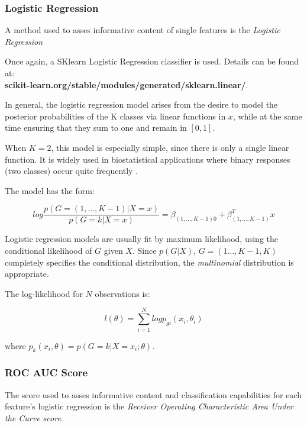 \documentclass[12pt,openright,twoside,a4paper]{book}
\begin{document}
\subsubsection{Logistic Regression}

A method used to asses informative content of single features is the \textit{Logistic Regression}

Once again, a SKlearn Logistic Regression classifier is used. 
Details can be found at: \\ \textbf{scikit-learn.org/stable/modules/generated/sklearn.linear/}.
\vspace{5mm}

In general, the logistic regression model arises from the desire to model the posterior probabilities of the K classes via linear functions in $x$, while at the same time ensuring that they sum to one and remain in $[0,1]$.

When $K = 2$, this model is especially simple, since there is only a single linear function. It is widely used in biostatistical applications where binary responses (two classes) occur quite frequently \cite{ESL}.

The model has the form:

\begin{equation}
log\frac{p(G=(1,...,K-1)|X=x)}{p(G=k|X=x)}=\beta_{(1,...,K-1)0}+\beta^T_{(1,...,K-1)}x
\end{equation}

Logistic regression models are usually fit by maximum likelihood, using the conditional likelihood of $G$ given $X$. Since $p(G|X)$, $G=(1...,K-1,K)$ completely specifies the conditional distribution, the \textit{multinomial} distribution is appropriate. 

The log-likelihood for $N$ observations is:

\begin{equation}
l(\theta)=\sum_{i=1}^N log p_{gi}(x_i,\theta_i)
\end{equation}

where $p_k(x_i,\theta)=p(G = k|X = x_i; \theta)$.

\subsubsection{ROC AUC Score}

The score used to asses informative content and classification capabilities for each feature's logistic regression is the \textit{Receiver Operating Characteristic Area Under the Curve score}.
\end{document}
